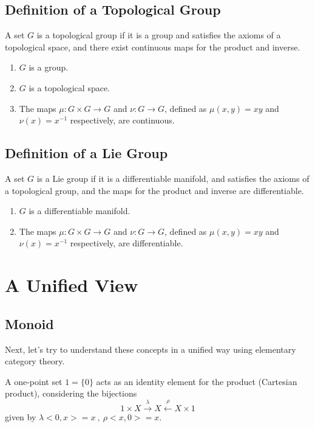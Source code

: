 \documentclass[uplatex,a4j,12pt,dvipdfmx]{jsarticle}
\begin{document}
\subsection{Definition of a Topological Group}

A set $G$ is a topological group if it is a group and satisfies the axioms of a topological space, and there exist continuous maps for the product and inverse.

\begin{enumerate}
	\item $G$ is a group.
	\item $G$ is a topological space.
	\item The maps $\mu: G \times G \to G$ and $\nu: G \to G$, defined as $\mu(x,y)=xy$ and $\nu(x) = x^{-1}$ respectively, are continuous.
\end{enumerate}

\subsection{Definition of a Lie Group}

A set $G$ is a Lie group if it is a differentiable manifold, and satisfies the axioms of a topological group, and the maps for the product and inverse are differentiable.

\begin{enumerate}
	\item $G$ is a differentiable manifold.
	\item The maps $\mu: G \times G \to G$ and $\nu: G \to G$, defined as $\mu(x,y)=xy$ and $\nu(x) = x^{-1}$ respectively, are differentiable.
\end{enumerate}


\section{A Unified View}

\subsection{Monoid}

Next, let's try to understand these concepts in a unified way using elementary category theory.

A one-point set $1 = \{ 0 \}$ acts as an identity element for the product (Cartesian product), considering the bijections
$$
	1 \times X \xrightarrow{\lambda} X \xleftarrow{\rho} X \times 1
$$
given by $\lambda<0,x>=x \ , \ \rho<x,0> = x $.
\end{document}
